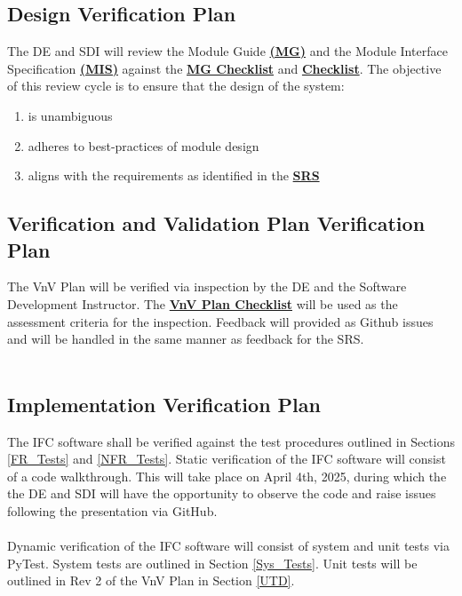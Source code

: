 \documentclass[12pt, titlepage]{article}
\begin{document}
\subsection{Design Verification Plan}
The DE and SDI will review the Module Guide 
\textbf{\href{https://github.com/KiranSingh15/CAS-741-Image-Correspondences/blob/main/docs/Design/SoftArchitecture/MG.pdf}
{(MG)}} and the Module Interface Specification 
\textbf{\href{https://github.com/KiranSingh15/CAS-741-Image-Correspondences/blob/main/docs/Design/SoftDetailedDes/MIS.pdf}
{(MIS)}} against the 
\textbf{\href{https://github.com/KiranSingh15/CAS-741-Image-Correspondences/blob/main/docs/Checklists/MG-Checklist.pdf}
{MG Checklist}} and
\textbf{\href{https://github.com/KiranSingh15/CAS-741-Image-Correspondences/blob/main/docs/Checklists/MIS-Checklist.pdf}
{ Checklist}}. The objective of this review cycle is to ensure that the design of the system:
\begin{enumerate}
\item is unambiguous
\item adheres to best-practices of module design
\item aligns with the requirements as identified in the 
\textbf{\href{https://github.com/KiranSingh15/CAS-741-Image-Correspondences/blob/main/docs/SRS/SRS.pdf}
{SRS}}
\end{enumerate}


\subsection{Verification and Validation Plan Verification Plan}
The VnV Plan will be verified via inspection by the DE and the 
Software Development Instructor. The 
\textbf{\href{https://github.com/KiranSingh15/CAS-741-Image-Correspondences/blob/main/docs/Checklists/VnV-Checklist.pdf}
{VnV Plan Checklist}} 
will be used as the assessment criteria for the inspection. 
Feedback will provided as Github issues and will be handled in the same manner as feedback 
for the SRS.\\ \\


\subsection{Implementation Verification Plan}
The IFC software shall be verified against the test procedures outlined in Sections \ref{FR_Tests} and 
\ref{NFR_Tests}. Static verification of the IFC software will consist of a code walkthrough. This will take 
place on April 4th, 2025, during which the the DE and SDI will have the opportunity to observe 
the code and raise issues following the presentation via GitHub. \\ \\
Dynamic verification of the IFC software will consist of system and unit tests via PyTest. System tests 
are outlined in Section \ref{Sys_Tests}. Unit tests will be outlined in Rev 2 of the VnV Plan in 
Section \ref{UTD}.
\end{document}
